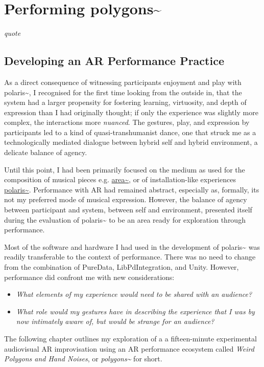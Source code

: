 \chapter{Performing polygons\textasciitilde{}}
\label{sec: polygons}
\epigraph{\emph{quote}}{\citep[]{bilbow2022}}
\section{Developing an AR Performance Practice} \label{sec: polygons-developing}
As a direct consequence of witnessing participants enjoyment and play with polaris\textasciitilde{}, I recognised for the first time looking from the outside in, that the system had a larger propensity for fostering learning, virtuosity, and depth of expression than I had originally thought; if only the experience was slightly more complex, the interactions more \textit{nuanced}. The gestures, play, and expression by participants led to a kind of quasi-transhumanist dance, one that struck me as a technologically mediated dialogue between hybrid self and hybrid environment, a delicate balance of agency.

Until this point, I had been primarily focused on the medium as used for the composition of musical pieces e.g. \hyperref[sec: area]{area\textasciitilde{}}, or of installation-like experiences \hyperref[sec: polaris]{polaris\textasciitilde{}}. Performance with AR had remained abstract, especially as, formally, its not my preferred mode of musical expression. However, the balance of agency between participant and system, between self and environment, presented itself during the evaluation of polaris\textasciitilde{} to be an area ready for exploration through performance. 

Most of the software and hardware I had used in the development of polaris\textasciitilde{} was readily transferable to the context of performance. There was no need to change from the combination of PureData, LibPdIntegration, and Unity. However, performance did confront me with new considerations: 
\begin{itemize}
    \item \textit{What elements of my experience would need to be shared with an audience?} 
    \item \textit{What role would my gestures have in describing the experience that I was by now intimately aware of, but would be strange for an audience?} 
\end{itemize}
The following chapter outlines my exploration of a a fifteen-minute experimental audiovisual AR improvisation using an AR performance ecosystem called \textit{Weird Polygons and Hand Noises}, or \textit{polygons\textasciitilde{}} for short.



